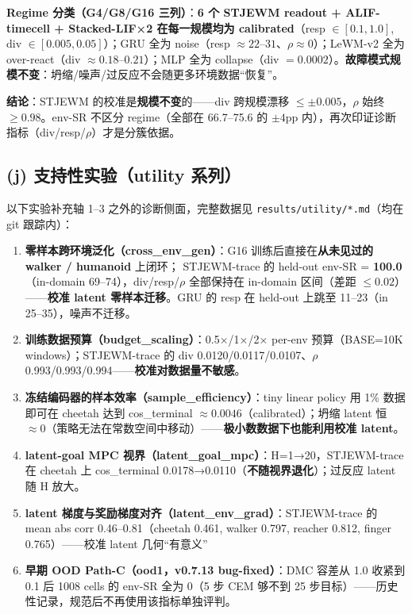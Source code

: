 \documentclass[11pt,a4paper]{article}
\begin{document}
\textbf{Regime 分类（G4/G8/G16 三列）}：\textbf{6 个 STJEWM readout + ALIF-timecell + Stacked-LIF×2 在每一规模均为 calibrated}（resp $\in [0.1,1.0]$, div $\in [0.005,0.05]$）；GRU 全为 noise（resp $\approx 22$--$31$、$\rho \approx 0$）；LeWM-v2 全为 over-react（div $\approx 0.18$--$0.21$）；MLP 全为 collapse（div $= 0.0002$）。\textbf{故障模式规模不变}：坍缩/噪声/过反应不会随更多环境数据“恢复”。

\textbf{结论}：STJEWM 的校准是\textbf{规模不变}的——div 跨规模漂移 $\le \pm 0.005$，$\rho$ 始终 $\ge 0.98$。env-SR 不区分 regime（全部在 66.7--75.6 的 $\pm 4$pp 内），再次印证诊断指标（div/resp/$\rho$）才是分簇依据。

\subsection{(j) 支持性实验（utility 系列）}

以下实验补充轴 1--3 之外的诊断侧面，完整数据见 \texttt{results/utility/*.md}（均在 git 跟踪内）：

\begin{enumerate}[leftmargin=2em]
    \item \textbf{零样本跨环境泛化（cross\_env\_gen）}：G16 训练后直接在\textbf{从未见过的 walker / humanoid} 上闭环；
    STJEWM-trace 的 held-out env-SR = \textbf{100.0}（in-domain 69--74），div/resp/$\rho$ 全部保持在 in-domain 区间（差距 $\le 0.02$）——\textbf{校准 latent 零样本迁移}。GRU 的 resp 在 held-out 上跳至 11--23（in 25--35），噪声不迁移。
    \item \textbf{训练数据预算（budget\_scaling）}：0.5×/1×/2× per-env 预算（BASE=10K windows）；STJEWM-trace 的 div 0.0120/0.0117/0.0107、$\rho$ 0.993/0.993/0.994——\textbf{校准对数据量不敏感}。
    \item \textbf{冻结编码器的样本效率（sample\_efficiency）}：tiny linear policy 用 1\% 数据即可在 cheetah 达到 cos\_terminal $\approx 0.0046$（calibrated）；坍缩 latent 恒 $\approx 0$（策略无法在常数空间中移动）——\textbf{极小数数据下也能利用校准 latent}。
    \item \textbf{latent-goal MPC 视界（latent\_goal\_mpc）}：H=1→20，STJEWM-trace 在 cheetah 上 cos\_terminal 0.0178→0.0110（\textbf{不随视界退化}）；过反应 latent 随 H 放大。
    \item \textbf{latent 梯度与奖励梯度对齐（latent\_env\_grad）}：STJEWM-trace 的 mean abs corr 0.46--0.81（cheetah 0.461, walker 0.797, reacher 0.812, finger 0.765）——校准 latent 几何“有意义”
    \item \textbf{早期 OOD Path-C（ood1，v0.7.13 bug-fixed）}：DMC 容差从 1.0 收紧到 0.1 后 1008 cells 的 env-SR 全为 0（5 步 CEM 够不到 25 步目标）——历史性记录，规范后不再使用该指标单独评判。
\end{enumerate}
\end{document}
